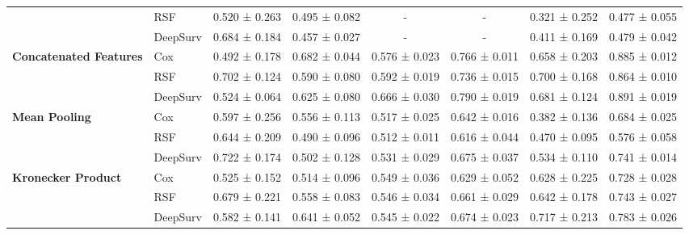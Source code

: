 \begin{sidewaystable}[htbp]
\begin{tabular}{@{}llcccccc@{}}
        & RSF & 0.520 ± 0.263 & 0.495 ± 0.082 & - & - & 0.321 ± 0.252 & 0.477 ± 0.055 \\
        & DeepSurv & 0.684 ± 0.184 & 0.457 ± 0.027 & - & - & 0.411 ± 0.169 & 0.479 ± 0.042 \\
        \midrule
        \multirow{3}{*}{\textbf{Concatenated Features}} & Cox & 0.492 ± 0.178 & 0.682 ± 0.044 & 0.576 ± 0.023 & 0.766 ± 0.011 & 0.658 ± 0.203 & 0.885 ± 0.012 \\
        & RSF & 0.702 ± 0.124 & 0.590 ± 0.080 & 0.592 ± 0.019 & 0.736 ± 0.015 & 0.700 ± 0.168 & 0.864 ± 0.010 \\
        & DeepSurv & 0.524 ± 0.064 & 0.625 ± 0.080 & 0.666 ± 0.030 & 0.790 ± 0.019 & 0.681 ± 0.124 & 0.891 ± 0.019 \\
        \midrule
        \multirow{3}{*}{\textbf{Mean Pooling}} & Cox & 0.597 ± 0.256 & 0.556 ± 0.113 & 0.517 ± 0.025 & 0.642 ± 0.016 & 0.382 ± 0.136 & 0.684 ± 0.025 \\
        & RSF & 0.644 ± 0.209 & 0.490 ± 0.096 & 0.512 ± 0.011 & 0.616 ± 0.044 & 0.470 ± 0.095 & 0.576 ± 0.058 \\
        & DeepSurv & 0.722 ± 0.174 & 0.502 ± 0.128 & 0.531 ± 0.029 & 0.675 ± 0.037 & 0.534 ± 0.110 & 0.741 ± 0.014 \\
        \midrule
        \multirow{3}{*}{\textbf{Kronecker Product}} & Cox & 0.525 ± 0.152 & 0.514 ± 0.096 & 0.549 ± 0.036 & 0.629 ± 0.052 & 0.628 ± 0.225 & 0.728 ± 0.028 \\
        & RSF & 0.679 ± 0.221 & 0.558 ± 0.083 & 0.546 ± 0.034 & 0.661 ± 0.029 & 0.642 ± 0.178 & 0.743 ± 0.027 \\
        & DeepSurv & 0.582 ± 0.141 & 0.641 ± 0.052 & 0.545 ± 0.022 & 0.674 ± 0.023 & 0.717 ± 0.213 & 0.783 ± 0.026 \\
        \bottomrule
    \end{tabular}
\end{sidewaystable}